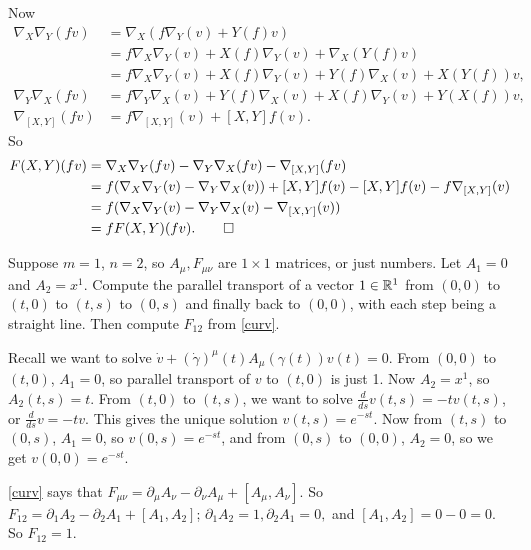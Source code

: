 \begin{solution}
    Now 
    \begin{align*}
        \nabla_X\nabla_Y(fv)&=\nabla_X(f\nabla_Y(v)+Y(f)v)\\
                            &=f\nabla_X\nabla_Y(v)+X(f)\nabla_Y(v)+\nabla_X(Y(f)v)\\
                            &=f\nabla_X\nabla_Y(v)+X(f)\nabla_Y(v)+Y(f)\nabla_X(v)+X(Y(f))v,\\
        \nabla_Y\nabla_X(fv)&=f\nabla_Y\nabla_X(v)+Y(f)\nabla_X(v)+X(f)\nabla_Y(v)+Y(X(f))v,\\
        \nabla_{[X,Y]}(fv)&=f\nabla_{ [X,Y]}(v)+[X,Y]f(v) .
    \end{align*}
    So 
    \begin{align*}
        F(X,Y)(fv)&=\nabla_X\nabla_Y(fv)-\nabla_Y\nabla_X(fv)-\nabla_{[X,Y]}(fv)\\
                  &=f(\nabla_X\nabla_Y(v)-\nabla_Y\nabla_X(v))+[X,Y]f(v)-[X,Y]f(v)-f\nabla_{[X,Y]}(v)\\
                  &=f(\nabla_X\nabla_Y(v)-\nabla_Y\nabla_X(v)-\nabla_{[X,Y]}(v))\\
                  &=fF(X,Y)(fv).\qedhere
    \end{align*}
\end{solution}
\begin{problem}
    Suppose $m=1$, $n=2$, so $A_{\mu}, F_{\mu\nu}$ are $1\times 1$ matrices, or just numbers. Let $A_1=0$ and $A_2=x^1.$ Compute the parallel transport of a vector $1 \in \mathbb{R}^1$ from $(0,0)$ to $(t,0)$ to $(t,s)$ to $(0,s)$ and finally back to $(0,0)$, with each step being a straight line. Then compute $F_{12}$ from \cref{curv}.
\end{problem}
\begin{solution}
    Recall we want to solve $\dot v + (\dot \gamma )^{\mu}(t)A_{\mu}(\gamma (t))v(t)=0$. From $(0,0)$ to $(t,0)$, $A_1=0$, so parallel transport of $v$ to $(t,0)$ is just 1. Now $A_2=x^1$, so $A_2(t,s)=t$. From $(t,0)$ to $(t,s)$, we want to solve $\frac{d}{ds}v(t,s)=-tv(t,s)$, or $\frac{d}{ds}v=-tv$. This gives the unique solution $v(t,s)=e^{-st}$. Now from $(t,s)$ to $(0,s)$, $A_1=0$, so $v(0,s)=e^{-st}$, and from $(0,s)$ to $(0,0)$, $A_2=0$, so we get $v(0,0)=e ^{-st}$.

    \cref{curv} says that $F_{\mu\nu}=\partial _{\mu}A_{\nu}-\partial _{\nu}A_{\mu}+[A_{\mu},A_{\nu}]$. So $F_{12}=\partial_1A_2-\partial_2A_1+[A_1,A_2]  $; $\partial_1A_2=1,\partial_2A_1=0,  $ and $[A_1,A_2]=0-0=0.$ So $F_{12}=1$.
\end{solution}

